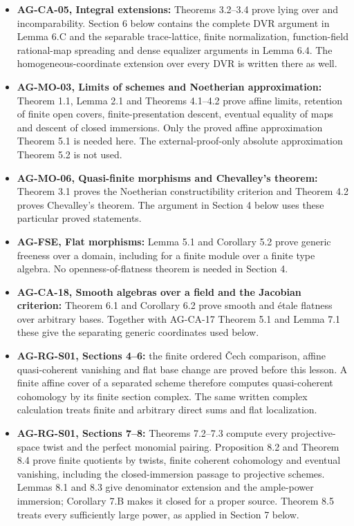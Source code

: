 \documentclass[11pt,a4paper,openany]{report}
\begin{document}
\begin{itemize}
\item
  \textbf{AG-CA-05, Integral extensions:} Theorems 3.2--3.4 prove lying over and incomparability. Section 6 below contains the complete DVR argument in Lemma 6.C and the separable trace-lattice, finite normalization, function-field rational-map spreading and dense equalizer arguments in Lemma 6.4. The homogeneous-coordinate extension over every DVR is written there as well.
\item
  \textbf{AG-MO-03, Limits of schemes and Noetherian approximation:} Theorem 1.1, Lemma 2.1 and Theorems 4.1--4.2 prove affine limits, retention of finite open covers, finite-presentation descent, eventual equality of maps and descent of closed immersions. Only the proved affine approximation Theorem 5.1 is needed here. The external-proof-only absolute approximation Theorem 5.2 is not used.
\item
  \textbf{AG-MO-06, Quasi-finite morphisms and Chevalley's theorem:} Theorem 3.1 proves the Noetherian constructibility criterion and Theorem 4.2 proves Chevalley's theorem. The argument in Section 4 below uses these particular proved statements.
\item
  \textbf{AG-FSE, Flat morphisms:} Lemma 5.1 and Corollary 5.2 prove generic freeness over a domain, including for a finite module over a finite type algebra. No openness-of-flatness theorem is needed in Section 4.
\item
  \textbf{AG-CA-18, Smooth algebras over a field and the Jacobian criterion:} Theorem 6.1 and Corollary 6.2 prove smooth and étale flatness over arbitrary bases. Together with AG-CA-17 Theorem 5.1 and Lemma 7.1 these give the separating generic coordinates used below.
\item
  \textbf{AG-RG-S01, Sections 4--6:} the finite ordered Čech comparison, affine quasi-coherent vanishing and flat base change are proved before this lesson. A finite affine cover of a separated scheme therefore computes quasi-coherent cohomology by its finite section complex. The same written complex calculation treats finite and arbitrary direct sums and flat localization.
\item
  \textbf{AG-RG-S01, Sections 7--8:} Theorems 7.2--7.3 compute every projective-space twist and the perfect monomial pairing. Proposition 8.2 and Theorem 8.4 prove finite quotients by twists, finite coherent cohomology and eventual vanishing, including the closed-immersion passage to projective schemes. Lemmas 8.1 and 8.3 give denominator extension and the ample-power immersion; Corollary 7.B makes it closed for a proper source. Theorem 8.5 treats every sufficiently large power, as applied in Section 7 below.

\end{itemize}
\end{document}
